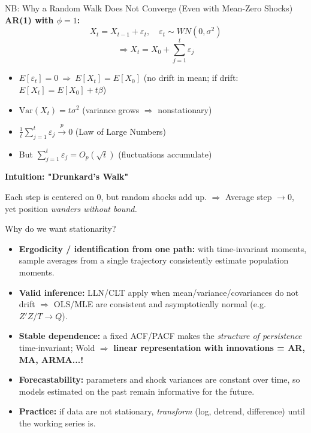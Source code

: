 \documentclass{beamer}
\begin{document}
\begin{frame}{NB: Why a Random Walk Does Not Converge (Even with Mean-Zero Shocks)}
\small
\textbf{AR(1) with $\phi = 1$:} 
\[
X_t = X_{t-1} + \varepsilon_t, \quad \varepsilon_t \sim WN(0,\sigma^2)
\]
\[
\Rightarrow X_t = X_0 + \sum_{j=1}^{t} \varepsilon_j
\]

\begin{itemize}
  \item $E[\varepsilon_t] = 0 \ \Rightarrow\ E[X_t] = E[X_0]$ (no drift in mean; if drift: $E[X_t]=E[X_0]+t\beta$)
  \item $\text{Var}(X_t) = t\sigma^2$ (variance grows $\Rightarrow$ nonstationary)
  \item $\displaystyle \frac{1}{t}\sum_{j=1}^{t}\varepsilon_j \xrightarrow{p} 0$ (Law of Large Numbers)
  \item But $\displaystyle \sum_{j=1}^{t}\varepsilon_j = O_p(\sqrt{t})$ (fluctuations accumulate)
\end{itemize}

\textbf{Intuition: "Drunkard’s Walk"}

Each step is centered on 0, but random shocks add up.  
$\Rightarrow$ Average step $\to 0$, yet position \emph{wanders without bound.}
\end{frame}


\begin{frame}{Why do we want stationarity?}
\small
\begin{itemize}
  \item \textbf{Ergodicity / identification from one path:} with time-invariant moments, sample averages from a single trajectory consistently estimate population moments.
  \item \textbf{Valid inference:} LLN/CLT apply when mean/variance/covariances do not drift $\Rightarrow$
        OLS/MLE are consistent and asymptotically normal (e.g. $Z'Z/T \to Q$).
  \item \textbf{Stable dependence:} a fixed ACF/PACF makes the \emph{structure of persistence} time-invariant; Wold $\Rightarrow$
   \textbf{     linear representation with innovations = AR, MA, ARMA...!}
  \item \textbf{Forecastability:} parameters and shock variances are constant over time, so models estimated on the past
        remain informative for the future.
  \item \textbf{Practice:} if data are not stationary, \emph{transform} (log, detrend, difference) until the working series is.
\end{itemize}
\end{frame}
\end{document}
